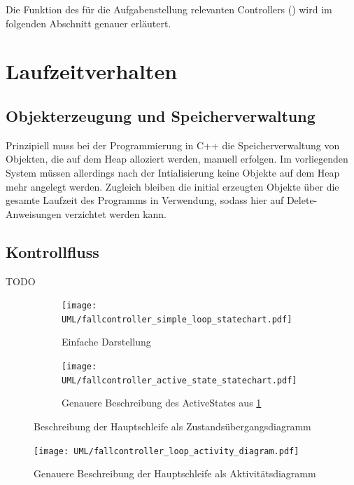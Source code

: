 Die Funktion des für die Aufgabenstellung relevanten Controllers () wird im folgenden Abschnitt genauer erläutert.

\section{Laufzeitverhalten}
\subsection{Objekterzeugung und Speicherverwaltung}
Prinzipiell muss bei der Programmierung in C++ die Speicherverwaltung von Objekten, die auf dem Heap alloziert werden, manuell erfolgen.
Im vorliegenden System müssen allerdings nach der Intialisierung keine Objekte auf dem Heap mehr angelegt werden.
Zugleich bleiben die initial erzeugten Objekte über die gesamte Laufzeit des Programms in Verwendung, sodass hier auf Delete-Anweisungen verzichtet werden kann.

\subsection{Kontrollfluss}
TODO

\begin{figure}[hb] \centering
	\begin{subfigure}[b]{0.4\textwidth}
		\texttt{[image: UML/fallcontroller\_simple\_loop\_statechart.pdf]}
		\caption{Einfache Darstellung}
		\label{uml:statechart_simleloop}
	\end{subfigure}\hspace{1cm}
	\begin{subfigure}[b]{0.4\textwidth}
 		\texttt{[image: UML/fallcontroller\_active\_state\_statechart.pdf]}
		\caption{Genauere Beschreibung des ActiveStates aus \ref{uml:statechart_simleloop}}
		\label{uml:statechart_activeState}
	\end{subfigure}
	\caption{Beschreibung der Hauptschleife als Zustandsübergangsdiagramm}
	\label{uml:statechart}
\end{figure}

\begin{figure}[hb] \centering
\end{figure}

\begin{figure}[hb] \centering
	\texttt{[image: UML/fallcontroller\_loop\_activity\_diagram.pdf]}
	\caption{Genauere Beschreibung der Hauptschleife als Aktivitätsdiagramm}
	\label{uml:activity_diagram}
\end{figure}

